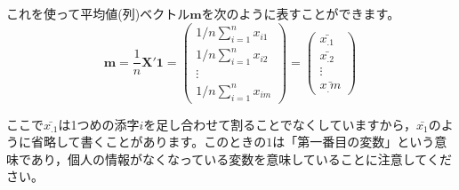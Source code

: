 \documentclass{ltjsbook}
\begin{document}
これを使って平均値(列)ベクトル$\bm{m}$を次のように表すことができます。
\[ \bm{m} = \frac{1}{n} \bm{X}' \bm{1} =
	\begin{pmatrix} 1/n\sum_{i=1}^{n} x_{i1} \\ 1/n\sum_{i=1}^{n} x_{i2} \\ \vdots \\ 1/n\sum_{i=1}^{n} x_{im} \end{pmatrix} =
	\begin{pmatrix}\bar{x_.1} \\ \bar{x_.2}\\ \vdots \\\bar{x_.m} \end{pmatrix} \]

ここで$\bar{x_.1}$は1つめの添字$i$を足し合わせて割ることでなくしていますから，$\bar{x_1}$のように省略して書くことがあります。このときの$1$は「第一番目の変数」という意味であり，個人の情報がなくなっている変数を意味していることに注意してください。
\end{document}
